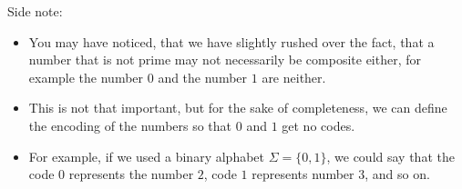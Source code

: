 Side note:
\begin{itemize}
    \item You may have noticed, that we have slightly rushed over the fact, that a number that is not prime may not necessarily be composite either, for example the number $0$ and the number $1$ are neither.
    \item This is not that important, but for the sake of completeness, we can define the encoding of the numbers so that $0$ and $1$ get no codes.
    \item For example, if we used a binary alphabet $\Sigma = \{0, 1\}$, we could say that the code $0$ represents the number $2$, code $1$ represents number $3$, and so on.
\end{itemize}
